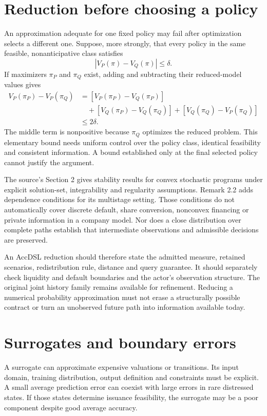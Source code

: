 \section{Reduction before choosing a policy}
An approximation adequate for one fixed policy may fail after optimization selects a different one. Suppose, more strongly, that every policy in the same feasible, nonanticipative class satisfies
\begin{equation}
 |V_P(\pi)-V_Q(\pi)|\leq\delta.
\end{equation}
If maximizers $\pi_P$ and $\pi_Q$ exist, adding and subtracting their reduced-model values gives
\begin{align}
 V_P(\pi_P)-V_P(\pi_Q)
 &= [V_P(\pi_P)-V_Q(\pi_P)]\nonumber\\
 &\quad+[V_Q(\pi_P)-V_Q(\pi_Q)]
       +[V_Q(\pi_Q)-V_P(\pi_Q)]\nonumber\\
 &\leq2\delta.
\end{align}
The middle term is nonpositive because $\pi_Q$ optimizes the reduced problem. This elementary bound needs uniform control over the policy class, identical feasibility and consistent information. A bound established only at the final selected policy cannot justify the argument.

The source's Section 2 gives stability results for convex stochastic programs under explicit solution-set, integrability and regularity assumptions. Remark 2.2 adds dependence conditions for its multistage setting. Those conditions do not automatically cover discrete default, share conversion, nonconvex financing or private information in a company model. Nor does a close distribution over complete paths establish that intermediate observations and admissible decisions are preserved.

An AccDSL reduction should therefore state the admitted measure, retained scenarios, redistribution rule, distance and query guarantee. It should separately check liquidity and default boundaries and the actor's observation structure. The original joint history family remains available for refinement. Reducing a numerical probability approximation must not erase a structurally possible contract or turn an unobserved future path into information available today.

\section{Surrogates and boundary errors}
A surrogate can approximate expensive valuations or transitions. Its input domain, training distribution, output definition and constraints must be explicit. A small average prediction error can coexist with large errors in rare distressed states. If those states determine issuance feasibility, the surrogate may be a poor component despite good average accuracy.


